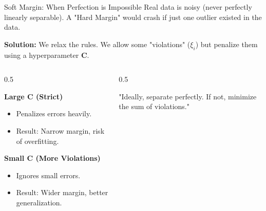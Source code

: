 \begin{frame}{Soft Margin: When Perfection is Impossible}
    Real data is noisy (never perfectly linearly separable). A "Hard Margin" would crash if just one outlier existed in the data.
    
    \textbf{Solution:} We relax the rules. We allow some "violations" ($\xi_i$) but penalize them using a hyperparameter \textbf{C}.

    \begin{columns}[c]
        \begin{column}{0.5\textwidth}
            \begin{tcolorbox}[colback=red!5, title=\textbf{The Hyperparameter C}]
                \textbf{Large C (Strict)}
                \begin{itemize}
                    \item Penalizes errors heavily.
                    \item Result: Narrow margin, risk of overfitting.
                \end{itemize}
                
                \vspace{0.5em}
                \textbf{Small C (More Violations)}
                \begin{itemize}
                    \item Ignores small errors.
                    \item Result: Wider margin, better generalization.
                \end{itemize}
            \end{tcolorbox}
        \end{column}
        \begin{column}{0.5\textwidth}
            \centering
            
            \vspace{0.5em}
            \small "Ideally, separate perfectly. If not, minimize the sum of violations."
        \end{column}
    \end{columns}
\end{frame}


